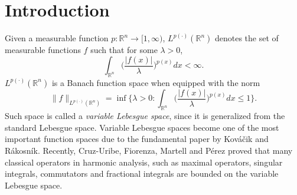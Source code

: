 \documentclass{amse-new}
\numberwithin{equation}{section} %
\begin{document}
\maketitle%






\section{Introduction}

Given a measurable function $p: \mathbb{R}^n\rightarrow [1,\infty)$, $L^{p(\cdot)}(\mathbb{R}^n)$ denotes the set of measurable functions $f$ such that for some $\lambda>0$,
$$\int_{\mathbb{R}^n}\Big(\frac{|f(x)|}{\lambda}\Big)^{p(x)}dx<\infty.$$
$L^{p(\cdot)}(\mathbb{R}^n)$ is a Banach function space when equipped with the norm
$$\|f\|_{L^{p(\cdot)}(\mathbb{R}^n)}=\inf\Big\{\lambda>0:\int_{\mathbb{R}^n}\Big(\frac{|f(x)|}{\lambda}\Big)^{p(x)}dx\leq 1\Big\}.$$
Such space is called a {\it variable Lebesgue space}, since it is generalized from the standard Lebesgue
space. Variable Lebesgue spaces become one of the most important function spaces due to the fundamental paper \cite{KR} by Kov\'{a}\v{c}ik and R\'{a}kosn\'{i}k. Recently, Cruz-Uribe, Fiorenza, Martell and P\'{e}rez \cite{CFMP} proved that many classical operators in harmonic analysis, such as maximal operators, singular integrals, commutators and fractional integrals are bounded on the variable Lebesgue space.
\end{document}
